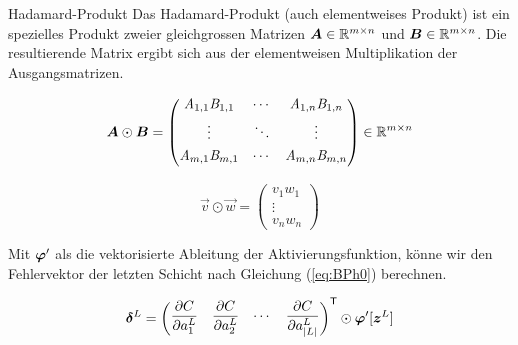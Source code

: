 \begin{appendices}
\begin{defbox}{Hadamard-Produkt}
  Das Hadamard-Produkt (auch elementweises Produkt) ist ein spezielles Produkt zweier gleichgrossen Matrizen
  $\bm{A} \in \mathbb{R}^{m \times n}$ und $\bm{B} \in \mathbb{R}^{m \times n}$.
  Die resultierende Matrix ergibt sich aus der elementweisen Multiplikation der Ausgangsmatrizen.

  \begin{minipage}{0.5\textwidth}
    \begin{equation*}
      \bm{A} \odot \bm{B} =
      \begin{pmatrix}
        \mathit{A}_{1,1} \mathit{B}_{1,1} & \cdots & \mathit{A}_{1,n} \mathit{B}_{1,n} \\[0.3em]
        \vdots & \ddots & \vdots \\[0.3em]
        \mathit{A}_{m,1} \mathit{B}_{m,1} & \cdots & \mathit{A}_{m,n} \mathit{B}_{m,n} \\[0.3em]
      \end{pmatrix}
      \in \mathbb{R}^{m \times n}
    \end{equation*}
  \end{minipage}
  \begin{minipage}{0.5\textwidth}
    \begin{equation*}
      \vec{v} \odot \vec{w} =
      \begin{pmatrix}
        v_1 w_1 \\
        \vdots \\
        v_n w_n
      \end{pmatrix}
    \end{equation*}

  \end{minipage}
\end{defbox}
\para{}

Mit $\bm{\varphi}'$ als die vektorisierte Ableitung der Aktivierungsfunktion,
könne wir den Fehlervektor der letzten Schicht nach Gleichung (\ref{eq:BPh0}) berechnen.

\begin{equation}\label{eq:BPh0}
  \bm{\delta}^L = \begin{pmatrix} \displaystyle\frac{\partial C}{\partial a_1^L} & \displaystyle\frac{\partial C}{\partial a_2^L} & \cdots & \displaystyle\frac{\partial C}{\partial a_{|L|}^L}\end{pmatrix}^{\mathsf{T}} \odot \bm{\varphi}'[\bm{z}^L]
\end{equation}


\end{appendices}
